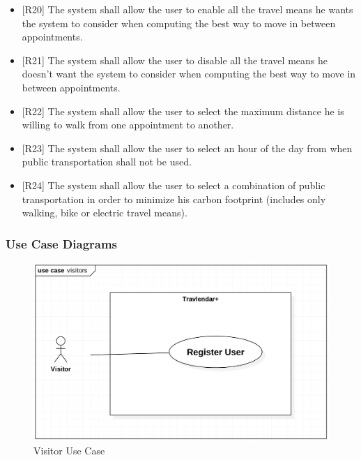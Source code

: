 \documentclass[12pt]{article}
\begin{document}
\begin{itemize}
    \item{[R20]} The system shall allow the user to enable all the travel means he wants the system to consider when computing the best way to move in between appointments.
    \item{[R21]} The system shall allow the user to disable all the travel means he doesn't want the system to consider when computing the best way to move in between appointments.
    \item{[R22]} The system shall allow the user to select the maximum distance he is willing to walk from one appointment to another.
    \item{[R23]} The system shall allow the user to select an hour of the day from when public transportation shall not be used.
    \item{[R24]} The system shall allow the user to select a combination of public transportation in order to minimize his carbon footprint (includes only walking, bike or electric travel means).
\end{itemize}

\newpage
\subsubsection{Use Case Diagrams}


\begin{figure}[H]
        \includegraphics[scale=0.4]{visitorUseCase.png}
        \centering
        \caption{Visitor Use Case}
    \label{fig:visitorUseCase}
\end{figure}
\end{document}
